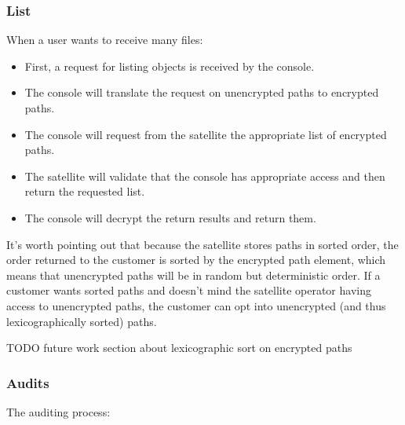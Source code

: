 \documentclass[a4paper,10pt]{article} \usepackage[utf8]{inputenc}
\newcommand{\todo}[1]{{\color{red} TODO #1 }}
\begin{document}
\subsubsection{List}

When a user wants to receive many files:

\begin{itemize}
\item First, a request for listing objects is received by the console.
\item The console will translate the request on unencrypted paths to encrypted
  paths.
\item The console will request from the satellite the appropriate list of
  encrypted paths.
\item The satellite will validate that the console has appropriate access
  and then return the requested list.
\item The console will decrypt the return results and return them.
\end{itemize}

It's worth pointing out that because the satellite stores paths in sorted
order, the order returned to the customer is sorted by the encrypted
path element, which means that unencrypted paths will be in random but
deterministic order. If a customer wants sorted paths and doesn't mind the
satellite operator having access to unencrypted paths, the customer can opt
into unencrypted (and thus lexicographically sorted) paths.

\todo{future work section about lexicographic sort on encrypted paths}

\subsubsection{Audits}

The auditing process:
\end{document}

